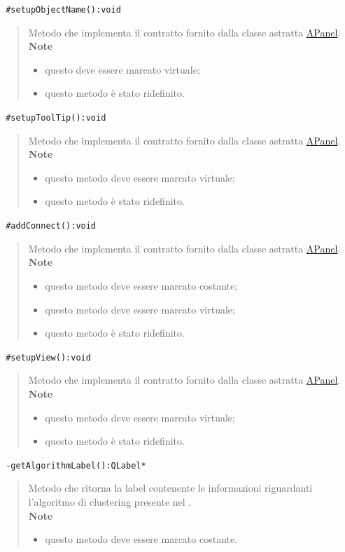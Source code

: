 \color{blue}\verb! #setupObjectName():void!
\begin{quote}
\color{black}Metodo che implementa il contratto fornito dalla classe astratta \hyperref[speAPanel]{APanel}.\\
 \textbf{Note}
 \begin{itemize}
  \item questo deve essere marcato virtuale;
 \item questo metodo è stato ridefinito.
 \end{itemize}
\end{quote} 
\color{blue}\verb! #setupToolTip():void!
\begin{quote}
\color{black}Metodo che implementa il contratto fornito dalla classe astratta \hyperref[speAPanel]{APanel}.\\
 \textbf{Note}
 \begin{itemize}
 \item questo metodo deve essere marcato virtuale;
 \item questo metodo è stato ridefinito.
 \end{itemize}
\end{quote} 
\color{blue}\verb! #addConnect():void!
\begin{quote}
\color{black}Metodo che implementa il contratto fornito dalla classe astratta \hyperref[speAPanel]{APanel}.\\
 \textbf{Note}
 \begin{itemize}
 \item questo metodo deve essere marcato costante;
 \item questo metodo deve essere marcato virtuale;
 \item questo metodo è stato ridefinito.
 \end{itemize}
\end{quote} 
\color{blue}\verb! #setupView():void!
\begin{quote}
\color{black}Metodo che implementa il contratto fornito dalla classe astratta \hyperref[speAPanel]{APanel}.\\
 \textbf{Note}
 \begin{itemize}
 \item questo metodo deve essere marcato virtuale;
 \item questo metodo è stato ridefinito.
 \end{itemize}
\end{quote}
\color{blue}\verb! -getAlgorithmLabel():QLabel*!
\begin{quote}
\color{black}Metodo che ritorna la label contenente le informazioni riguardanti l'algoritmo di clustering\g{} presente nel \protocol{}.\\
 \textbf{Note}
 \begin{itemize}
 \item questo metodo deve essere marcato costante.
 \end{itemize}
\end{quote}
